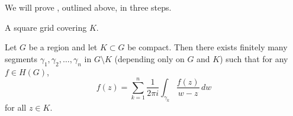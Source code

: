 


We will prove , outlined above, in three steps.

\begin{marginfigure}

	\caption{\label{prop101:figa} A square grid covering $K$.}
\end{marginfigure}

\begin{proposition}\label{prop10.1}
	Let $G$ be a region and let $K \subset G$ be compact.
	Then there exists finitely many segments $\gamma_1, \gamma_2, \dots, \gamma_n$ in $G \setminus K$ (depending only on $G$ and $K$) such that for any $f \in H(G)$,
	\[
		f(z) = \sum_{k = 1}^n \frac{1}{2 \pi i} \int_{\gamma_k} \frac{f(z)}{w - z} \, d w
	\]
	for all $z \in K$.
\end{proposition}

